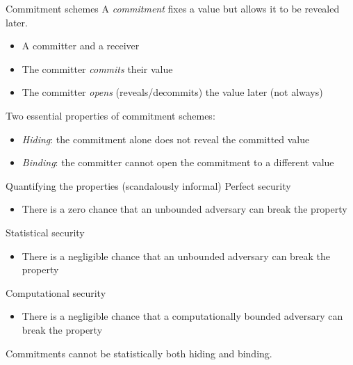 \begin{frame}{Commitment schemes}
  A \emph{commitment} fixes a value but allows it to be revealed later.
  \begin{itemize}[<+(1)->]
    \item A committer and a receiver
    \item The committer \emph{commits} their value
    \item The committer \emph{opens} (reveals/decommits) the value later (not always)
  \end{itemize}

  \vspace*{1em}

  \pause
  Two essential properties of commitment schemes:
  \begin{itemize}[<+(1)->]
    \item \emph{Hiding}: the commitment alone does not reveal the committed value
    \item \emph{Binding}: the committer cannot open the commitment to a different value
  \end{itemize}
\end{frame}

\begin{frame}{Quantifying the properties (scandalously informal)}
  Perfect security
  \begin{itemize}
    \item There is a zero chance that an unbounded adversary can break the property
  \end{itemize}

  \pause
  Statistical security
  \begin{itemize}
    \item There is a negligible chance that an unbounded adversary can break the property
  \end{itemize}

  \pause
  Computational security
  \begin{itemize}
    \item There is a negligible chance that a computationally bounded adversary can break the property
  \end{itemize}

  \pause
  Commitments cannot be statistically both hiding and binding.
\end{frame}

